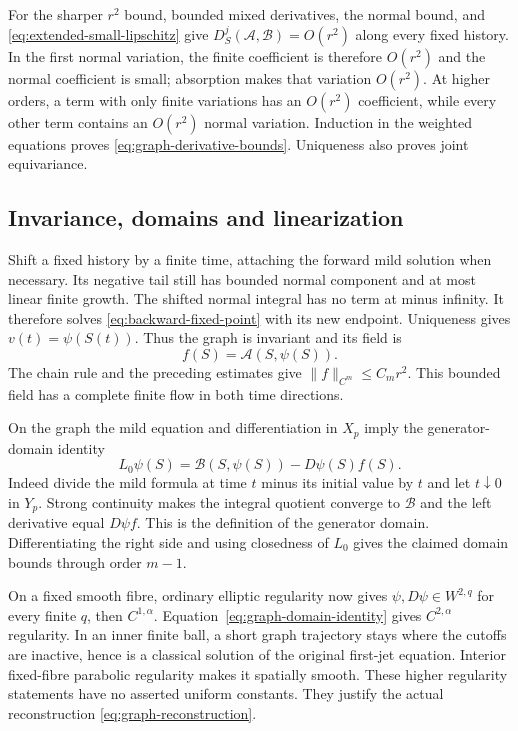 For the sharper $r^2$ bound, bounded mixed derivatives,
the normal bound, and \eqref{eq:extended-small-lipschitz}
give $D_S^j(\mathcal A,\mathcal B)=O(r^2)$ along every
fixed history. In the first normal variation, the finite
coefficient is therefore $O(r^2)$ and the normal coefficient
is small; absorption makes that variation $O(r^2)$.
At higher orders, a term with only finite variations has
an $O(r^2)$ coefficient, while every other term contains
an $O(r^2)$ normal variation. Induction in the weighted
equations proves \eqref{eq:graph-derivative-bounds}.
Uniqueness also proves joint equivariance.

\subsection{Invariance, domains and linearization}

Shift a fixed history by a finite time, attaching the forward
mild solution when necessary. Its negative tail still has
bounded normal component and at most linear finite growth.
The shifted normal integral has no term at minus infinity.
It therefore solves \eqref{eq:backward-fixed-point} with
its new endpoint. Uniqueness gives $v(t)=\psi(S(t))$.
Thus the graph is invariant and its field is
\begin{equation}\label{eq:finite-field}
                       f(S)=\mathcal A(S,\psi(S)).
\end{equation}
The chain rule and the preceding estimates give
$\|f\|_{C^m}\le C_mr^2$. This bounded field has a
complete finite flow in both time directions.

On the graph the mild equation and differentiation in
$X_p$ imply the generator-domain identity
\begin{equation}\label{eq:graph-domain-identity}
             L_0\psi(S)=\mathcal B(S,\psi(S))-D\psi(S)f(S).
\end{equation}
Indeed divide the mild formula at time $t$ minus its
initial value by $t$ and let $t\downarrow0$ in $Y_p$.
Strong continuity makes the integral quotient converge
to $\mathcal B$ and the left derivative equal $D\psi f$.
This is the definition of the generator domain.
Differentiating the right side and using closedness of
$L_0$ gives the claimed domain bounds through order $m-1$.

On a fixed smooth fibre, ordinary elliptic regularity now
gives $\psi,D\psi\in W^{2,q}$ for every finite $q$,
then $C^{1,\alpha}$. Equation~\eqref{eq:graph-domain-identity}
gives $C^{2,\alpha}$ regularity. In an inner finite ball,
a short graph trajectory stays where the cutoffs are
inactive, hence is a classical solution of the original
first-jet equation. Interior fixed-fibre parabolic
regularity makes it spatially smooth. These higher
regularity statements have no asserted uniform constants.
They justify the actual reconstruction
\eqref{eq:graph-reconstruction}.

